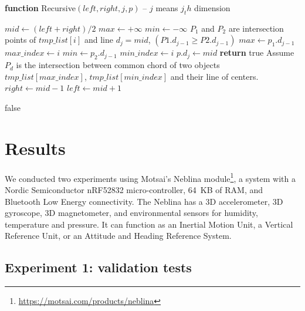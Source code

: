 \documentclass[10pt, conference, compsocconf]{IEEEtran}
\begin{document}
\begin{algorithm}
    \begin{flushleft}
        \textbf{function} Recursive$(left, right, j, p)$  -- $j$ means $j_th$ dimension
    \end{flushleft}
    \begin{algorithmic}[1]
            \State $mid \gets (left + right)/2$
            \State $max \gets +\infty$
            \State $min \gets -\infty$
                \State $P_1$ and $P_2$ are intersection points of $tmp\_list[i]$ and line $d_{j}=mid$, $(P1.d_{j-1}\geqslant P2.d_{j-1})$
                    \State $max \gets p_1.d_{j-1}$
                    \State $max\_index \gets i$
                \EndIf
                    \State $min \gets p_2.d_{j-1}$
                    \State $min\_index \gets i$
                \EndIf
            \EndFor
                \State $p.d_j \gets mid$
                    \State \textbf{return} true
                \EndIf
            \EndIf
            \State Assume $P_d$ is the intersection between common chord of two objects $tmp\_list[max\_index]$, $tmp\_list[min\_index]$ and their line of centers.
                \State $right \gets mid-1$
                \State $left \gets mid+1$
            \EndIf

        \EndWhile
        \Return false
    \end{algorithmic}
\end{algorithm}

\section{Results}

We conducted two experiments using Motsai's Neblina 
module\footnote{\url{ https://motsai.com/products/neblina}}, a system 
with a Nordic Semiconductor nRF52832 micro-controller, 64~KB of RAM, 
and Bluetooth Low Energy connectivity. The Neblina has a 3D 
accelerometer, 3D gyroscope, 3D magnetometer, and environmental sensors 
for humidity, temperature and pressure. It can function as an Inertial
Motion Unit, a Vertical Reference Unit, or an Attitude and Heading Reference
System. 

\subsection{Experiment 1: validation tests}
\end{document}
